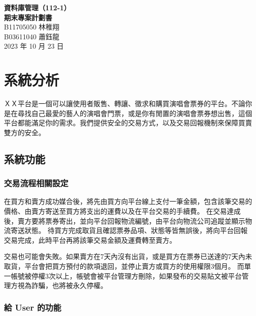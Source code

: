 \documentclass[12pt,a4paper]{article}
\begin{document}
\title{}
\author{}
\date{}

\begin{center}
\textbf{\Large 資料庫管理（112-1） \\[5pt]
期末專案計劃書} \\[10pt]
B11705050 林稚翔 \\
B03611040 蕭鈺龍 \\
2023 年 10 月 23 日
\end{center}





\section{系統分析}

ＸＸ平台是一個可以讓使用者販售、轉讓、徵求和購買演唱會票券的平台。不論你是在尋找自己最愛的藝人的演唱會門票，或是你有閒置的演唱會票券想出售，這個平台都能滿足你的需求。我們提供安全的交易方式，以及交易回報機制來保障買賣雙方的安全。

\subsection{系統功能}    

\subsubsection{交易流程相關設定}

在買方和賣方成功媒合後，將先由買方向平台線上支付一筆金額，包含該筆交易的價格、由賣方寄送至買方將支出的運費以及在平台交易的手續費。
在交易達成後，賣方要將票券寄出，並向平台回報物流編號，由平台向物流公司追蹤並顯示物流寄送狀態。
待買方完成取貨且確認票券品項、狀態等皆無誤後，將向平台回報交易完成，此時平台再將該筆交易金額及運費轉至賣方。

交易也可能會失敗。如果賣方在7天內沒有出貨，或是買方在票券已送達的7天內未取貨，平台會把買方預付的款項退回，並停止賣方或買方的使用權限3個月。
而單一帳號被停權3次以上，帳號會被平台管理方刪除，如果發布的交易貼文被平台管理方視為詐騙，也將被永久停權。





\subsubsection{給 User 的功能}
\end{document}
